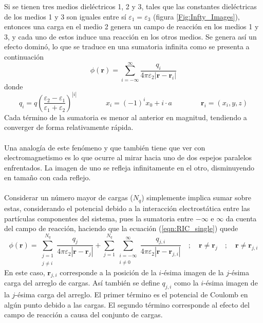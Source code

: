 \documentclass[12pt, twoside, onehalfspace, numbers, spanish]{ezthesis}
\numberwithin{equation}{section}
\begin{document}
\noindent
Si se tienen tres medios dieléctricos 1, 2 y 3, tales que las constantes dieléctricas de los medios 1 y 3 son iguales entre sí $\varepsilon_1 = \varepsilon_3$ (figura \ref{Fig:Infty_Images}), entonces una carga en el medio 2 genera un campo de reacción en los medios 1 y 3, y cada uno de estos induce una reacción en los otros medios. Se genera así un efecto dominó, lo que se traduce en una sumatoria infinita \cite{Pei-kun} como se presenta a continuación
\begin{equation}\label{eqn:RIC_single}
\phi(\mathbf{r}) = \sum_{i=-\infty}^\infty\frac{q_i}{4\pi\varepsilon_2|\mathbf{r} - \mathbf{r}_i|}
\end{equation}
donde
\begin{equation}\label{eqn:RIC_terms}
q_i = q\left(\frac{\varepsilon_2 - \varepsilon_1}{\varepsilon_1 + \varepsilon_2}\right)^{|i|} \qquad\qquad x_i=(-1)^ix_0 + i\cdot a \qquad\qquad \mathbf{r}_i=(x_i,y,z)
\end{equation}
Cada término de la sumatoria es menor al anterior en magnitud, tendiendo a converger de forma relativamente rápida.\\\\
Una analogía de este fenómeno y que también tiene que ver con electromagnetismo es lo que ocurre al mirar hacia uno de dos espejos paralelos enfrentados. La imagen de uno se refleja infinitamente en el otro, disminuyendo en tamaño con cada reflejo.\\\\
Considerar un número mayor de cargas ($N_q$) simplemente implica sumar sobre estas, considerando el potencial debido a la interacción electrostática entre las partículas componentes del sistema, pues la sumatoria entre $-\infty$ e $\infty$ da cuenta del campo de reacción, haciendo que la ecuación (\ref{eqn:RIC_single}) quede
\begin{equation}\label{eqn:RIC_multi}
\phi(\mathbf{r}) = \sum_{\substack{j = 1\\j\neq i}}^{N_q} \frac{q_j}{4\pi\varepsilon_2|\mathbf{r} - \mathbf{r}_j|} + \sum_{j=1}^{N_q}\sum_{\substack{i=-\infty\\i\neq 0}}^\infty\frac{q_{j,i}}{4\pi\varepsilon_2|\mathbf{r} - \mathbf{r}_{j,i}|}\quad ; \quad \mathbf{r} \neq \mathbf{r}_j\quad ; \quad \mathbf{r} \neq \mathbf{r}_{j,i}
\end{equation}
En este caso, $\mathbf{r}_{j,i}$ corresponde a la posición de la $i$-ésima imagen de la $j$-ésima carga del arreglo de cargas. Así también se define $q_{j,i}$ como la $i$-ésima imagen de la $j$-ésima carga del arreglo. El primer término es el potencial de Coulomb en algún punto debido a las cargas. El segundo término corresponde al efecto del campo de reacción a causa del conjunto de cargas.\\\\
\end{document}
